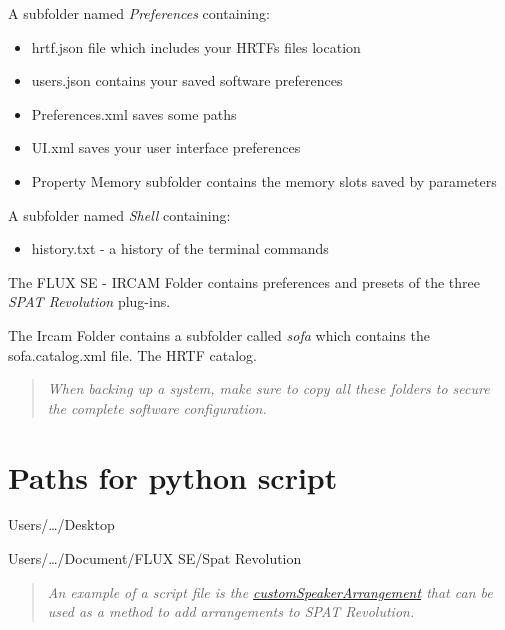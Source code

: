 \documentclass[
  letterpaper,
  DIV=11,
  numbers=noendperiod]{scrreport}
\providecommand{\tightlist}{%
  \setlength{\itemsep}{0pt}\setlength{\parskip}{0pt}}\usepackage{longtable,booktabs,array}
\begin{document}
A subfolder named \emph{Preferences} containing:

\begin{itemize}
\tightlist
\item
  hrtf.json file which includes your HRTFs files location
\item
  users.json contains your saved software preferences
\item
  Preferences.xml saves some paths
\item
  UI.xml saves your user interface preferences
\item
  Property Memory subfolder contains the memory slots saved by
  parameters
\end{itemize}

A subfolder named \emph{Shell} containing:

\begin{itemize}
\tightlist
\item
  history.txt - a history of the terminal commands
\end{itemize}

The FLUX SE - IRCAM Folder contains preferences and presets of the three
\emph{SPAT Revolution} plug-ins.

The Ircam Folder contains a subfolder called \emph{sofa} which contains
the sofa.catalog.xml file. The HRTF catalog.

\begin{quote}
\emph{When backing up a system, make sure to copy all these folders to
secure the complete software configuration.}
\end{quote}

\hypertarget{paths-for-python-script}{%
\section{Paths for python script}\label{paths-for-python-script}}

Users/\ldots/Desktop

Users/\ldots/Document/FLUX SE/Spat Revolution

\begin{quote}
\emph{An example of a script file is the
\href{https://public.3.basecamp.com/p/rQStK3igPkaXisYS4Gs5sJ2g/upload/download/customSpeakerArrangement.py?disposition=attachment}{customSpeakerArrangement}
that can be used as a method to add arrangements to \emph{SPAT
Revolution}.}
\end{quote}

\end{document}
